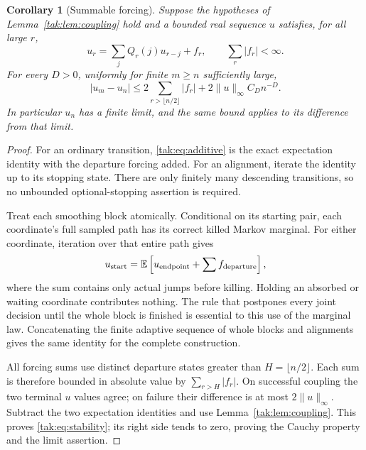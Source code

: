 \documentclass[11pt,letterpaper]{article}
\newtheorem{corollary}[theorem]{Corollary}
\theoremstyle{remark}\newtheorem{remark}[theorem]{Remark}
\newcommand{\E}{\mathbb E}\newcommand{\Pp}{\mathbb P}
\begin{document}
\begin{corollary}[Summable forcing]\label{tak:cor:forcing}
Suppose the hypotheses of Lemma~\ref{tak:lem:coupling} hold and a bounded real sequence $u$ satisfies, for all large $r$,
\begin{equation}
 u_r=\sum_jQ_r(j)u_{r-j}+f_r,\qquad \sum_r|f_r|<\infty.\label{tak:eq:additive}
\end{equation}
For every $D>0$, uniformly for finite $m\geq n$ sufficiently large,
\begin{equation}
 |u_m-u_n|\leq2\sum_{r>\lfloor n/2\rfloor}|f_r|
                +2\|u\|_\infty C_Dn^{-D}.\label{tak:eq:stability}
\end{equation}
In particular $u_n$ has a finite limit, and the same bound applies to its difference from that limit.
\end{corollary}
\begin{proof}
For an ordinary transition, \eqref{tak:eq:additive} is the exact expectation identity with the departure forcing added. For an alignment, iterate the identity up to its stopping state. There are only finitely many descending transitions, so no unbounded optional-stopping assertion is required.

Treat each smoothing block atomically. Conditional on its starting pair, each coordinate's full sampled path has its correct killed Markov marginal. For either coordinate, iteration over that entire path gives
\[
 u_{\rm start}=\E\left[u_{\rm endpoint}+\sum f_{\rm departure}\right],
\]
where the sum contains only actual jumps before killing. Holding an absorbed or waiting coordinate contributes nothing. The rule that postpones every joint decision until the whole block is finished is essential to this use of the marginal law. Concatenating the finite adaptive sequence of whole blocks and alignments gives the same identity for the complete construction.

All forcing sums use distinct departure states greater than $H=\lfloor n/2\rfloor$. Each sum is therefore bounded in absolute value by $\sum_{r>H}|f_r|$. On successful coupling the two terminal $u$ values agree; on failure their difference is at most $2\|u\|_\infty$. Subtract the two expectation identities and use Lemma~\ref{tak:lem:coupling}. This proves \eqref{tak:eq:stability}; its right side tends to zero, proving the Cauchy property and the limit assertion.
\end{proof}
\end{document}

